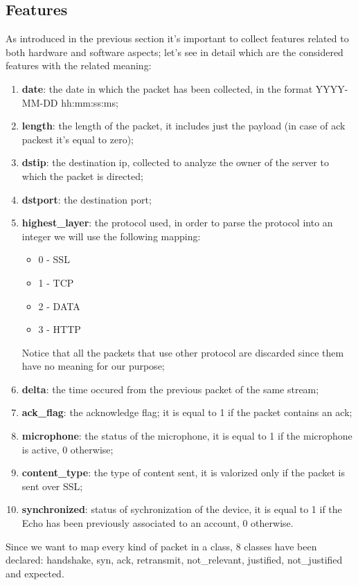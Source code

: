 \documentclass[sigconf]{acmart}
\begin{document}
    \subsection{Features}
    As introduced in the previous section it's important to collect features related to both hardware and software aspects; let's see in detail which are the considered features with the related meaning:
    \begin{enumerate}
        \item \textbf{date}: the date in which the packet has been collected, in the format YYYY-MM-DD hh:mm:ss:ms;
        \item \textbf{length}: the length of the packet, it includes just the payload (in case of ack packest it's equal to zero);
        \item \textbf{dstip}: the destination ip, collected to analyze the owner of the server to which the packet is directed;
        \item \textbf{dstport}: the destination port;
        \item \textbf{highest\_layer}: the protocol used, in order to parse the protocol into an integer we will use the following mapping:
        \begin{itemize}
            \item 0 - SSL
            \item 1 - TCP
            \item 2 - DATA
            \item 3 - HTTP
        \end{itemize}
        Notice that all the packets that use other protocol are discarded since them have no meaning for our purpose;
        \item \textbf{delta}: the time occured from the previous packet of the same stream;
        \item \textbf{ack\_flag}: the acknowledge flag; it is equal to 1 if the packet contains an ack;
        \item \textbf{microphone}: the status of the microphone, it is equal to 1 if the microphone is active, 0 otherwise;
        \item \textbf{content\_type}: the type of content sent, it is valorized only if the packet is sent over SSL;
        \item \textbf{synchronized}: status of sychronization of the device, it is equal to 1 if the Echo has been previously associated to an account, 0 otherwise.
    \end{enumerate}
    Since we want to map every kind of packet in a class, 8 classes have been declared: handshake, syn, ack, retransmit, not\_relevant, justified, not\_justified and expected.
\end{document}

